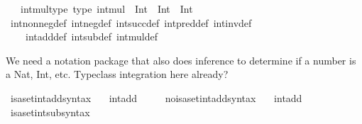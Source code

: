 \begin{isabellebody}
\ \ \ int{\isacharunderscore}{\kern0pt}mul{\isacharunderscore}{\kern0pt}type\ {\isacharbrackleft}{\kern0pt}type{\isacharbrackright}{\kern0pt}{\isacharcolon}{\kern0pt}\ {\isachardoublequoteopen}int{\isacharunderscore}{\kern0pt}mul\ {\isacharcolon}{\kern0pt}\ Int\ {\isasymRightarrow}\ Int\ {\isasymRightarrow}\ Int{\isachardoublequoteclose}\isanewline
%
\isadelimproof
\ \ %
\endisadelimproof
%
\isatagproof
{}\isamarkupfalse%
\ int{\isacharunderscore}{\kern0pt}nonneg{\isacharunderscore}{\kern0pt}def\ int{\isacharunderscore}{\kern0pt}neg{\isacharunderscore}{\kern0pt}def\ int{\isacharunderscore}{\kern0pt}succ{\isacharunderscore}{\kern0pt}def\ int{\isacharunderscore}{\kern0pt}pred{\isacharunderscore}{\kern0pt}def\ int{\isacharunderscore}{\kern0pt}inv{\isacharunderscore}{\kern0pt}def\isanewline
\ \ \ \ int{\isacharunderscore}{\kern0pt}add{\isacharunderscore}{\kern0pt}def\ int{\isacharunderscore}{\kern0pt}sub{\isacharunderscore}{\kern0pt}def\ int{\isacharunderscore}{\kern0pt}mul{\isacharunderscore}{\kern0pt}def\isanewline
{}\isamarkupfalse%
%
\endisatagproof
{\isafoldproof}%
%
\isadelimproof
%
\endisadelimproof
%
\begin{isamarkuptext}%
We need a notation package that also does inference to determine if a
number is a Nat, Int, etc. Typeclass integration here already?%
\end{isamarkuptext}\isamarkuptrue%
\isamarkupfalse%
\ isa{\isacharunderscore}{\kern0pt}set{\isacharunderscore}{\kern0pt}int{\isacharunderscore}{\kern0pt}add{\isacharunderscore}{\kern0pt}syntax\ \ \isamarkupfalse%
\ int{\isacharunderscore}{\kern0pt}add\ {\isacharparenleft}{\kern0pt}\ {\isachardoublequoteopen}{\isacharplus}{\kern0pt}{\isachardoublequoteclose}\ {}{}{\isacharparenright}{\kern0pt}\ \isamarkupfalse%
\isanewline
{}\isamarkupfalse%
\ no{\isacharunderscore}{\kern0pt}isa{\isacharunderscore}{\kern0pt}set{\isacharunderscore}{\kern0pt}int{\isacharunderscore}{\kern0pt}add{\isacharunderscore}{\kern0pt}syntax\ \ \isamarkupfalse%
\ int{\isacharunderscore}{\kern0pt}add\ {\isacharparenleft}{\kern0pt}\ {\isachardoublequoteopen}{\isacharplus}{\kern0pt}{\isachardoublequoteclose}\ {}{}{\isacharparenright}{\kern0pt}\ \isamarkupfalse%
\isanewline
\isanewline
{}\isamarkupfalse%
\ isa{\isacharunderscore}{\kern0pt}set{\isacharunderscore}{\kern0pt}int{\isacharunderscore}{\kern0pt}sub{\isacharunderscore}{\kern0pt}syntax\ \ \isamarkupfalse%

\end{isabellebody}
